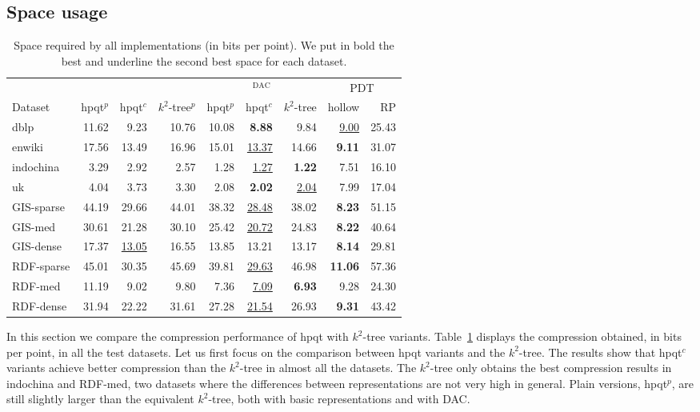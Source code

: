 \documentclass{elsarticle}
\newcommand{\DAC}{\ensuremath{\mathrm{DAC}}}
\newcommand{\kt}{$k^2$-tree\xspace}
\newcommand{\ktplain}{$k^2$-tree$^p$\xspace}
\newcommand{\dblp}{\textsf{dblp}\xspace}
\newcommand{\enwiki}{\textsf{enwiki}\xspace}
\newcommand{\indo}{\textsf{indochina}\xspace}
\newcommand{\uk}{\textsf{uk}\xspace}
\newcommand{\giss}{\textsf{GIS-sparse}\xspace}
\newcommand{\gism}{\textsf{GIS-med}\xspace}
\newcommand{\gisd}{\textsf{GIS-dense}\xspace}
\newcommand{\rdfs}{\textsf{RDF-sparse}\xspace}
\newcommand{\rdfm}{\textsf{RDF-med}\xspace}
\newcommand{\rdfd}{\textsf{RDF-dense}\xspace}
\newcommand{\hpqt}{\textsf{hpqt}\xspace}
\newcommand{\hpqtp}{\textsf{hpqt$^p$}\xspace}
\newcommand{\hpqtR}{\textsf{hpqt$^{c}$}\xspace}
\newcommand{\pdt}{PDT\xspace}
\begin{document}
\subsection{Space usage}

\begin{table}
\footnotesize
\centering
\begin{tabular}{ l | r r r | r r r  | r r}
 & & & & \multicolumn{3}{|c|}{$^{\DAC}$} & \multicolumn{2}{c}{\pdt} \\
Dataset & \hpqtp & \hpqtR & \ktplain & \hpqtp & \hpqtR & \kt & hollow & RP \\
\hline
\dblp	& 11.62	& 9.23	& 10.76	& 10.08	& \textbf{8.88}	& 9.84 & \underline{9.00} & 25.43\\
\enwiki	& 17.56	& 13.49	& 16.96	& 15.01	& \underline{13.37}	& 14.66 & \textbf{9.11} & 31.07\\
\hline
\indo	& 3.29	& 2.92	& 2.57	& 1.28	& \underline{1.27}	& \textbf{1.22} & 7.51 & 16.10 \\
\uk	    & 4.04	& 3.73	& 3.30	& 2.08	& \textbf{2.02}	& \underline{2.04} & 7.99 & 17.04\\
\hline
\giss	& 44.19	& 29.66	& 44.01	& 38.32	& \underline{28.48}	& 38.02 & \textbf{8.23} & 51.15\\
\gism	& 30.61	& 21.28	& 30.10	& 25.42	& \underline{20.72}	& 24.83 & \textbf{8.22} & 40.64\\
\gisd	& 17.37	& \underline{13.05}	& 16.55	& 13.85	& 13.21	& 13.17 &\textbf{ 8.14} & 29.81 \\
\hline
\rdfs	& 45.01	& 30.35	& 45.69	& 39.81	& \underline{29.63}	& 46.98 & \textbf{11.06} & 57.36 \\
\rdfm	& 11.19	& 9.02	& 9.80	& 7.36	& \underline{7.09}	& \textbf{6.93} & 9.28 & 24.30 \\
\rdfd	& 31.94	& 22.22	& 31.61	& 27.28	& \underline{21.54}	& 26.93 & \textbf{9.31} & 43.42 \\
\hline
\end{tabular}
\caption{Space required by all implementations (in bits per point). We put in bold the best and underline the second best space for each dataset.}
\label{tab:space}
\end{table}

In this section we compare the compression performance of \hpqt with \kt variants. Table~\ref{tab:space} displays the compression obtained, in bits per point, in all the test datasets. Let us first focus on the comparison between \hpqt variants and the \kt. The results show that \hpqtR variants achieve better compression than the \kt in almost all the datasets. The \kt only obtains the best compression results in \indo and \rdfm, two datasets where the differences between representations are not very high in general. Plain versions, \hpqtp, are still slightly larger than the equivalent \kt, both with basic representations and with DAC. 
\end{document}
